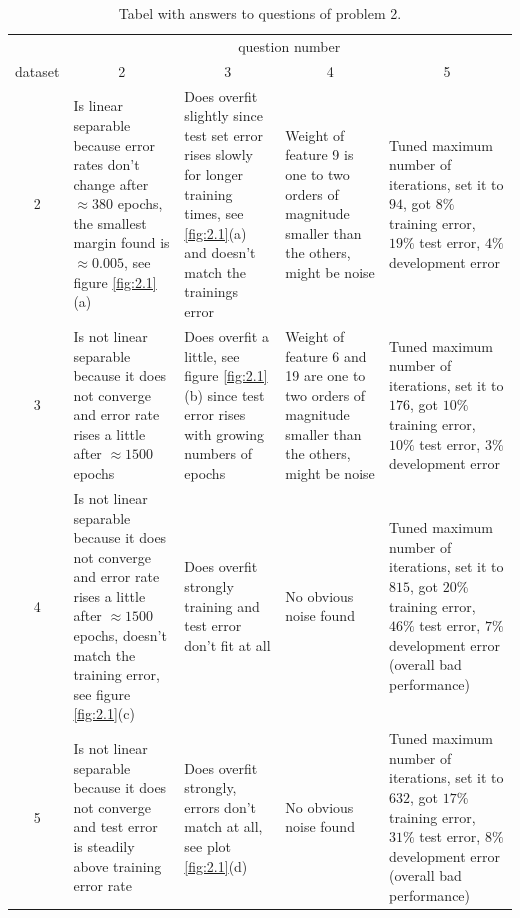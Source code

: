 \documentclass[12pt]{article}
\begin{document}
\begin{table}[H]
	\centering
	\begin{tabularx}{\textwidth}{c|X|X|X|X|}
		& \multicolumn{4}{c|}{question number} \\
		dataset & \multicolumn{1}{c}{2} & \multicolumn{1}{c}{3} & \multicolumn{1}{c}{4} & \multicolumn{1}{c|}{5} \\
		\midrule
		2     &   Is linear separable because error rates don't change after $\approx 380$ epochs, the smallest margin found is $\approx 0.005$, see figure \ref{fig:2.1}(a)  &  Does overfit slightly since test set error rises slowly for longer training times, see \ref{fig:2.1}(a) and doesn't match the trainings error     &   Weight of feature 9 is one to two orders of magnitude smaller than the others, might be noise  & Tuned maximum number of iterations, set it to $94$, got $8\%$ training error, $19\%$ test error, $4\%$ development error \\
		\midrule
		3     &   Is not linear separable because it does not converge and error rate rises a little after $\approx 1500$ epochs    &    Does overfit a little, see figure \ref{fig:2.1}(b) since test error rises with growing numbers of epochs   &   Weight of feature 6 and 19 are one to two orders of magnitude smaller than the others, might be noise    & Tuned maximum number of iterations, set it to $176$, got $10\%$ training error, $10\%$ test error, $3\%$ development error \\
		\midrule
		4     &   Is not linear separable because it does not converge and error rate rises a little after $\approx 1500$ epochs, doesn't match the training error, see figure \ref{fig:2.1}(c)   &    Does overfit strongly training and test error don't fit at all   &   No obvious noise found    & Tuned maximum number of iterations, set it to $815$, got $20\%$ training error, $46\%$ test error, $7\%$ development error (overall bad performance) \\
		\midrule
		5     &   Is not linear separable because it does not converge and test error is steadily above training error rate     &    Does overfit strongly, errors don't match at all, see plot \ref{fig:2.1}(d)   &   No obvious noise found    & Tuned maximum number of iterations, set it to $632$, got $17\%$ training error, $31\%$ test error, $8\%$ development error (overall bad performance) \\
		\bottomrule
	\end{tabularx}%
	\caption{Tabel with answers to questions of problem 2.}
	\label{tab:1}%
\end{table}%
\end{document}
